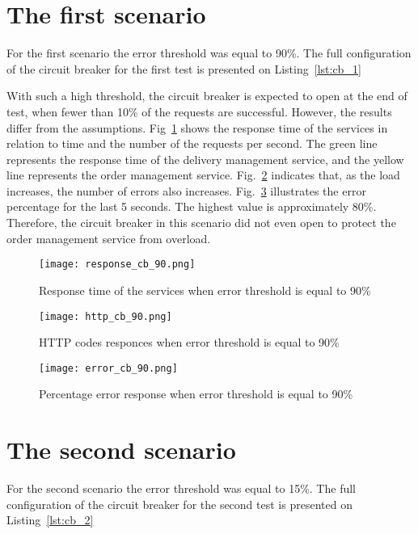 \section{The first scenario}\label{sec:test_description_1}
For the first scenario the error threshold was equal to 90\%.
The full configuration of the circuit breaker for the first test is presented on Listing~\ref{lst:cb_1}



With such a high threshold, the circuit breaker is expected to open at the end of test, when fewer than 10\% of the requests are successful.
However, the results differ from the assumptions.
Fig~\ref{fig:response-cb-90} shows the response time of the services in relation to time and the number of the requests per second. The green line represents the response time of the delivery management service, and the yellow line represents the order management service.
Fig.~\ref{fig:http-cb-90} indicates that, as the load increases, the number of errors also increases.
Fig.~\ref{fig:error-cb-90} illustrates the error percentage for the last 5 seconds. The highest value is approximately 80\%.
Therefore, the circuit breaker in this scenario did not even open to protect the order management service from overload.

\begin{figure}[t]
    \centering
    \texttt{[image: response\_cb\_90.png]}
    \caption{Response time of the services when error threshold is equal to 90\%}
    \label{fig:response-cb-90}
\end{figure}
\begin{figure}[t]
    \centering
    \texttt{[image: http\_cb\_90.png]}
    \caption{HTTP codes responces when error threshold is equal to 90\%}
    \label{fig:http-cb-90}
\end{figure}
\begin{figure}[t]
    \centering
    \texttt{[image: error\_cb\_90.png]}
    \caption{Percentage error response when error threshold is equal to 90\%}
    \label{fig:error-cb-90}
\end{figure}

\section{The second scenario}\label{sec:test_description_2}
For the second scenario the error threshold was equal to 15\%.
The full configuration of the circuit breaker for the second test is presented on Listing~\ref{lst:cb_2}


